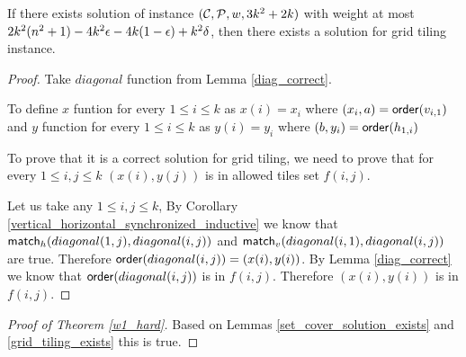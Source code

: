 \begin{lemma}
\label{grid_tiling_exists}
	If there exists solution of instance $(\mathcal{C}, \mathcal{P}, w, 3k^2+2k)$
	with weight at most $2k^2(n^2+1) - 4k^2\epsilon -4k(1-\epsilon) +k^2\delta$,
	then there exists a solution for grid tiling instance.
\end{lemma}

\begin{proof}
Take $diagonal$ function from Lemma \ref{diag_correct}.

To define $x$ funtion 
for every $1 \le i \le k$ as $x(i) = x_i$
where $(x_i, a) = \mathsf{order}(v_{i,1})$
and $y$ function 
for every $1 \le i \le k$ as $y(i) = y_i$
where $(b, y_i) = \mathsf{order}(h_{1,i})$

To prove that it is a correct solution for grid tiling,
we need to prove that 
for every $1 \le i,j \le k$ $(x(i), y(j))$ is in
allowed tiles set $f(i,j)$.

Let us take any $1 \le i,j \le k$,
By Corollary \ref{vertical_horizontal_synchronized_inductive}
we know that $\mathsf{match}_h(diagonal(1, j),diagonal(i, j))$ and
$\mathsf{match}_v(diagonal(i, 1),diagonal(i, j))$ are true.
Therefore $\mathsf{order}(diagonal(i,j)) = (x(i), y(i))$.
By Lemma \ref{diag_correct} we know that 
$\mathsf{order}(diagonal(i,j))$ is in $f(i,j)$.
Therefore 
$(x(i), y(i))$
is in $f(i,j)$.

\end{proof}

\begin{proof}[Proof of Theorem \ref{w1_hard}]
Based on Lemmas \ref{set_cover_solution_exists} and \ref{grid_tiling_exists}
this is true.
\end{proof}
